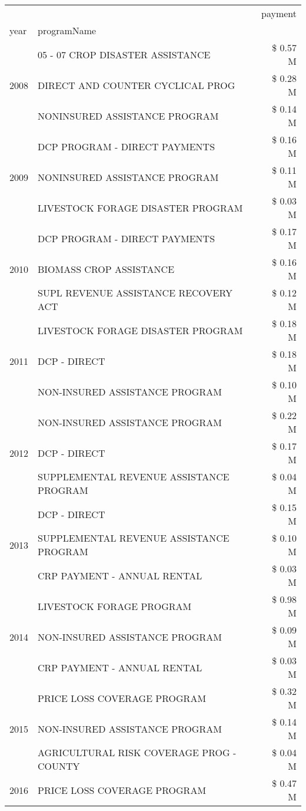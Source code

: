 \begin{tabular}{llr}
\toprule
 &  & payment \\
year & programName &  \\
\midrule
\multirow[t]{3}{*}{2008} & 05 - 07 CROP DISASTER ASSISTANCE & \$ 0.57 M \\
 & DIRECT AND COUNTER CYCLICAL PROG & \$ 0.28 M \\
 & NONINSURED ASSISTANCE PROGRAM & \$ 0.14 M \\
\cline{1-3}
\multirow[t]{3}{*}{2009} & DCP PROGRAM - DIRECT PAYMENTS & \$ 0.16 M \\
 & NONINSURED ASSISTANCE PROGRAM & \$ 0.11 M \\
 & LIVESTOCK FORAGE DISASTER  PROGRAM & \$ 0.03 M \\
\cline{1-3}
\multirow[t]{3}{*}{2010} & DCP PROGRAM - DIRECT PAYMENTS & \$ 0.17 M \\
 & BIOMASS CROP ASSISTANCE & \$ 0.16 M \\
 & SUPL REVENUE ASSISTANCE RECOVERY ACT & \$ 0.12 M \\
\cline{1-3}
\multirow[t]{3}{*}{2011} & LIVESTOCK FORAGE DISASTER PROGRAM & \$ 0.18 M \\
 & DCP - DIRECT & \$ 0.18 M \\
 & NON-INSURED ASSISTANCE PROGRAM & \$ 0.10 M \\
\cline{1-3}
\multirow[t]{3}{*}{2012} & NON-INSURED ASSISTANCE PROGRAM & \$ 0.22 M \\
 & DCP - DIRECT & \$ 0.17 M \\
 & SUPPLEMENTAL REVENUE ASSISTANCE PROGRAM & \$ 0.04 M \\
\cline{1-3}
\multirow[t]{3}{*}{2013} & DCP - DIRECT & \$ 0.15 M \\
 & SUPPLEMENTAL REVENUE ASSISTANCE PROGRAM & \$ 0.10 M \\
 & CRP PAYMENT - ANNUAL RENTAL & \$ 0.03 M \\
\cline{1-3}
\multirow[t]{3}{*}{2014} & LIVESTOCK FORAGE PROGRAM & \$ 0.98 M \\
 & NON-INSURED ASSISTANCE PROGRAM & \$ 0.09 M \\
 & CRP PAYMENT - ANNUAL RENTAL & \$ 0.03 M \\
\cline{1-3}
\multirow[t]{3}{*}{2015} & PRICE LOSS COVERAGE PROGRAM & \$ 0.32 M \\
 & NON-INSURED ASSISTANCE PROGRAM & \$ 0.14 M \\
 & AGRICULTURAL RISK COVERAGE PROG - COUNTY & \$ 0.04 M \\
\cline{1-3}
\multirow[t]{3}{*}{2016} & PRICE LOSS COVERAGE PROGRAM                   & \$ 0.47 M \\

\end{tabular}
